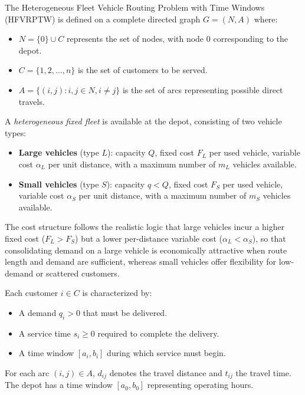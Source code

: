 \documentclass[11pt]{article}
\begin{document}
The Heterogeneous Fleet Vehicle Routing Problem with Time Windows (HFVRPTW) is defined on a complete directed graph $G = (N, A)$ where:
\begin{itemize}[leftmargin=*]
    \item $N = \{0\} \cup C$ represents the set of nodes, with node $0$ corresponding to the depot.
    \item $C = \{1, 2, \ldots, n\}$ is the set of customers to be served.
    \item $A = \{(i,j) : i,j \in N, i \neq j\}$ is the set of arcs representing possible direct travels.
\end{itemize}

A \emph{heterogeneous fixed fleet} is available at the depot, consisting of two vehicle types:
\begin{itemize}[leftmargin=*]
    \item \textbf{Large vehicles} (type $L$): capacity $Q$, fixed cost $F_L$ per used vehicle, variable cost $\alpha_L$ per unit distance, with a maximum number of $m_L$ vehicles available.
    \item \textbf{Small vehicles} (type $S$): capacity $q < Q$, fixed cost $F_S$ per used vehicle, variable cost $\alpha_S$ per unit distance, with a maximum number of $m_S$ vehicles available.
\end{itemize}
The cost structure follows the realistic logic that large vehicles incur a higher fixed cost ($F_L > F_S$) but a lower per-distance variable cost ($\alpha_L < \alpha_S$), so that consolidating demand on a large vehicle is economically attractive when route length and demand are sufficient, whereas small vehicles offer flexibility for low-demand or scattered customers.

Each customer $i \in C$ is characterized by:
\begin{itemize}[leftmargin=*]
    \item A demand $q_i > 0$ that must be delivered.
    \item A service time $s_i \geq 0$ required to complete the delivery.
    \item A time window $[a_i, b_i]$ during which service must begin.
\end{itemize}
For each arc $(i,j) \in A$, $d_{ij}$ denotes the travel distance and $t_{ij}$ the travel time. The depot has a time window $[a_0, b_0]$ representing operating hours.
\end{document}
